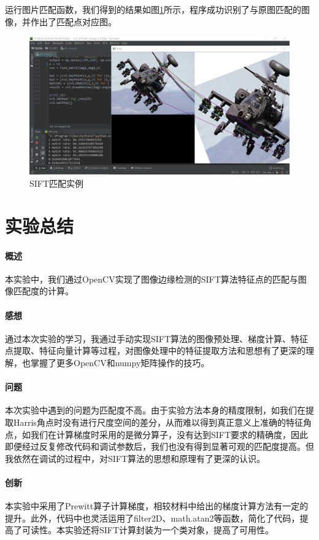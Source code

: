 \documentclass{article}
\begin{document}
运行图片匹配函数，我们得到的结果如图\ref{fig4}所示，程序成功识别了与原图匹配的图像，并作出了匹配点对应图。
\begin{figure}[htbp]
\centering
\includegraphics[width=13.5cm]{img/4.png}
\caption{SIFT匹配实例}
\label{fig4}
\end{figure}

\section{实验总结}
\paragraph{概述}
本实验中，我们通过OpenCV实现了图像边缘检测的SIFT算法特征点的匹配与图像匹配度的计算。

\paragraph{感想}
通过本次实验的学习，我通过手动实现SIFT算法的图像预处理、梯度计算、特征点提取、特征向量计算等过程，对图像处理中的特征提取方法和思想有了更深的理解，也掌握了更多OpenCV和numpy矩阵操作的技巧。

\paragraph{问题}
本次实验中遇到的问题为匹配度不高。由于实验方法本身的精度限制，如我们在提取Harris角点时没有进行尺度空间的差分，从而难以得到真正意义上准确的特征角点，如我们在计算梯度时采用的是微分算子，没有达到SIFT要求的精确度，因此即便经过反复修改代码和调试参数后，我们也没有得到显著可观的匹配度提高。但我依然在调试的过程中，对SIFT算法的思想和原理有了更深的认识。

\paragraph{创新}
本实验中采用了Prewitt算子计算梯度，相较材料中给出的梯度计算方法有一定的提升。此外，代码中也灵活运用了filter2D、math.atan2等函数，简化了代码，提高了可读性。本实验还将SIFT计算封装为一个类对象，提高了可用性。
\end{document}

